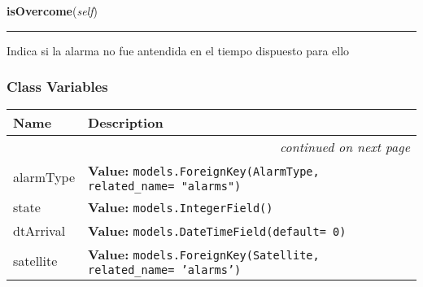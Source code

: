     \label{GroundSegment:models:Alarm:Alarm:Alarm:isOvercome}

    \vspace{0.5ex}

\hspace{.8\funcindent}\begin{boxedminipage}{\funcwidth}

    \raggedright \textbf{isOvercome}(\textit{self})

    \vspace{-1.5ex}

    \rule{\textwidth}{0.5\fboxrule}
\setlength{\parskip}{2ex}
    Indica si la alarma no fue antendida en el tiempo dispuesto para ello

\setlength{\parskip}{1ex}
    \end{boxedminipage}



  \subsubsection{Class Variables}

    \vspace{-1cm}
\hspace{\varindent}\begin{longtable}{|p{\varnamewidth}|p{\vardescrwidth}|l}
\cline{1-2}
\cline{1-2} \centering \textbf{Name} & \centering \textbf{Description}& \\
\cline{1-2}
\endhead\cline{1-2}\multicolumn{3}{r}{\small\textit{continued on next page}}\\\endfoot\cline{1-2}
\endlastfoot\raggedright a\-l\-a\-r\-m\-T\-y\-p\-e\- & \raggedright \textbf{Value:} 
{\tt models.ForeignKey(AlarmType, related\_name= "alarms")}&\\
\cline{1-2}
\raggedright s\-t\-a\-t\-e\- & \raggedright \textbf{Value:} 
{\tt models.IntegerField()}&\\
\cline{1-2}
\raggedright d\-t\-A\-r\-r\-i\-v\-a\-l\- & \raggedright \textbf{Value:} 
{\tt models.DateTimeField(default= 0)}&\\
\cline{1-2}
\raggedright s\-a\-t\-e\-l\-l\-i\-t\-e\- & \raggedright \textbf{Value:} 
{\tt models.ForeignKey(Satellite, related\_name= 'alarms')}&\\
\cline{1-2}
\end{longtable}

